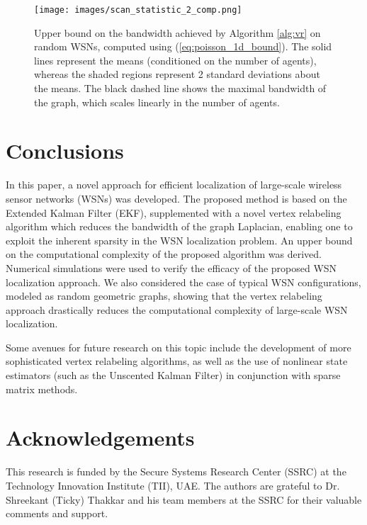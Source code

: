 \documentclass[twocolumn]{article}
\theoremstyle{plain}
\theoremstyle{definition}
\theoremstyle{definition}
\theoremstyle{remark}
\begin{document}
\begin{figure*}[t]
\centering
\texttt{[image: images/scan\_statistic\_2\_comp.png]}
\caption{Upper bound on the bandwidth achieved by Algorithm \ref{alg:vr} on random WSNs, computed using (\ref{eq:poisson_1d_bound}). The solid lines represent the means (conditioned on the number of agents), whereas the shaded regions represent 2 standard deviations about the means. The black dashed line shows the maximal bandwidth of the graph, which scales linearly in the number of agents.}
\label{fig:scan_statistic}
\end{figure*}

\section{Conclusions}
In this paper, a novel approach for efficient localization of large-scale wireless sensor networks (WSNs) was developed. The proposed method is based on the Extended Kalman Filter (EKF), supplemented with a novel vertex relabeling algorithm which reduces the bandwidth of the graph Laplacian, enabling one to exploit the inherent sparsity in the WSN localization problem. An upper bound on the computational complexity of the proposed algorithm was derived.
Numerical simulations were used to verify the efficacy of the proposed WSN localization approach.
We also considered the case of typical WSN configurations, modeled as random geometric graphs, showing that the vertex relabeling approach drastically reduces the computational complexity of large-scale WSN localization.

Some avenues for future research on this topic include the development of more sophisticated vertex relabeling algorithms, as well as the use of nonlinear state estimators (such as the Unscented Kalman Filter) in conjunction with sparse matrix methods.

\section*{Acknowledgements}
This research is funded by the Secure Systems Research Center (SSRC) at the Technology Innovation Institute (TII), UAE. The authors are grateful to Dr. Shreekant (Ticky) Thakkar and his team members at the SSRC for their valuable comments and support.
\end{document}
